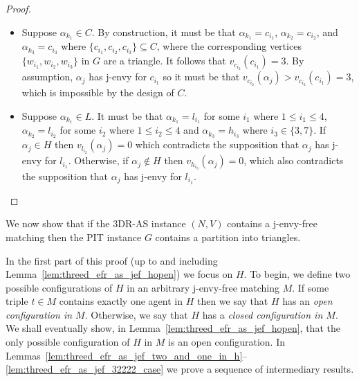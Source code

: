 \begin{proof}
\begin{itemize}
\begin{itemize}
    \end{itemize}
    \item Suppose $\alpha_{k_1} \in C$. By construction, it must be that $\alpha_{k_1} = c_{i_1}$, $\alpha_{k_2} = c_{i_2}$, and $\alpha_{k_3} = c_{i_3}$ where $\{ c_{i_1}, c_{i_2}, c_{i_3} \} \subseteq C$, where the corresponding vertices $\{ w_{i_1}, w_{i_2}, w_{i_3} \}$ in $G$ are a triangle. It follows that  $v_{c_{i_2}}(c_{i_1}) = 3$. By assumption, $\alpha_j$ has j-envy for $c_{i_1}$ so it must be that $v_{c_{i_2}}(\alpha_j) > v_{c_{i_2}}(c_{i_1}) = 3$, which is impossible by the design of $C$.
    \item Suppose $\alpha_{k_1} \in L$. It must be that $\alpha_{k_1} = l_{i_1}$ for some $i_1$ where $1\leq i_1 \leq 4$, $\alpha_{k_2} = l_{i_2}$ for some $i_2$ where $1\leq i_2 \leq 4$ and $\alpha_{k_3} = h_{i_3}$ where $i_3 \in \{ 3, 7 \}$. If $\alpha_j \in H$ then $v_{l_{i_2}}(\alpha_j) = 0$ which contradicts the supposition that $\alpha_j$ has j-envy for $l_{i_1}$. Otherwise, if $\alpha_j \notin H$ then $v_{h_{i_3}}(\alpha_j) = 0$, which also contradicts the supposition that $\alpha_j$ has j-envy for $l_{i_1}$.
\end{itemize}
\end{proof}


We now show that if the 3DR-AS instance $(N, V)$ contains a j-envy-free matching then the PIT instance $G$ contains a partition into triangles.

In the first part of this proof (up to and including Lemma~\ref{lem:threed_efr_as_jef_hopen}) we focus on $H$. To begin, we define two possible configurations of $H$ in an arbitrary j-envy-free matching $M$. If some triple $t\in M$ contains exactly one agent in $H$ then we say that $H$ has an \emph{open configuration in $M$}. Otherwise, we say that $H$ has a \emph{closed configuration in $M$}. We shall eventually show, in Lemma~\ref{lem:threed_efr_as_jef_hopen}, that the only possible configuration of $H$ in $M$ is an open configuration. In Lemmas~\ref{lem:threed_efr_as_jef_two_and_one_in_h}--\ref{lem:threed_efr_as_jef_32222_case} we prove a sequence of intermediary results. 

